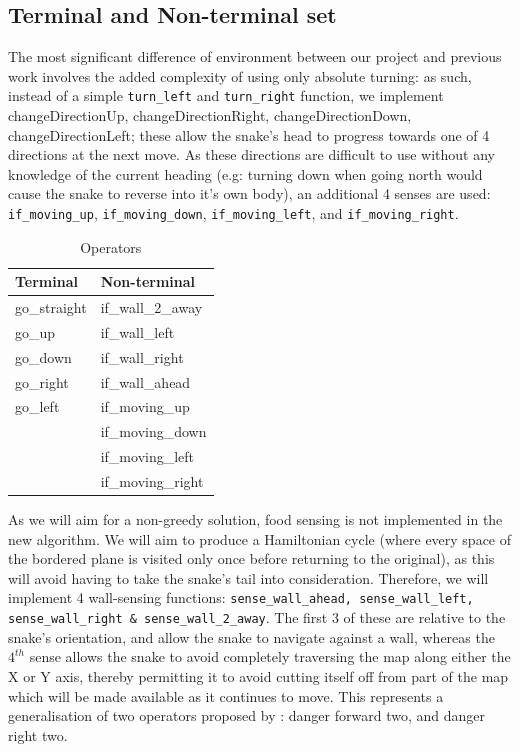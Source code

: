 \documentclass[british,10pt,a4paper]{article}
\begin{document}
\subsection{Terminal and Non-terminal set}
\label{subsec:design_terminals}
The most significant difference of environment between our project and previous work involves the added complexity of using only absolute turning: as such, instead of a simple \texttt{turn\_left} and \texttt{turn\_right} function, we implement changeDirectionUp, changeDirectionRight, changeDirectionDown, changeDirectionLeft; these allow the snake's head to progress towards one of 4 directions at the next move. As these directions are difficult to use without any knowledge of the current heading (e.g: turning down when going north would cause the snake to reverse into it's own body), an additional 4 senses are used: \texttt{if\_moving\_up}, \texttt{if\_moving\_down}, \texttt{if\_moving\_left}, and \texttt{if\_moving\_right}. 
\begin{table}
	\centering
	\begin{tabular}{|l|l|}
		\hline
		\textbf{Terminal} & \textbf{Non-terminal} \\ \hline
		go\_straight      & if\_wall\_2\_away     \\ \hline
		go\_up            & if\_wall\_left        \\ \hline
		go\_down          & if\_wall\_right       \\ \hline
		go\_right         & if\_wall\_ahead       \\ \hline
		go\_left          & if\_moving\_up        \\ \hline
		                  & if\_moving\_down      \\ \hline
		                  & if\_moving\_left      \\ \hline
		                  & if\_moving\_right     \\ \hline
	\end{tabular}
	\caption{Operators}
	\label{tab:operators}
\end{table}
As we will aim for a non-greedy solution, food sensing is not implemented in the new algorithm. We will aim to produce a Hamiltonian cycle (where every space of the bordered plane is visited only once before returning to the original), as this will avoid having to take the snake's tail into consideration. Therefore, we will implement 4 wall-sensing functions: \texttt{sense\_wall\_ahead, sense\_wall\_left, sense\_wall\_right \& sense\_wall\_2\_away}. The first 3 of these are relative to the snake's orientation, and allow the snake to navigate against a wall, whereas the $4^{th}$ sense allows the snake to avoid completely traversing the map along either the X or Y axis, thereby permitting it to avoid cutting itself off from part of the map which will be made available as it continues to move. This represents a generalisation of two operators proposed by \citet{Christopher_Lockhart2010-em}: danger forward two, and danger right two.
\end{document}
